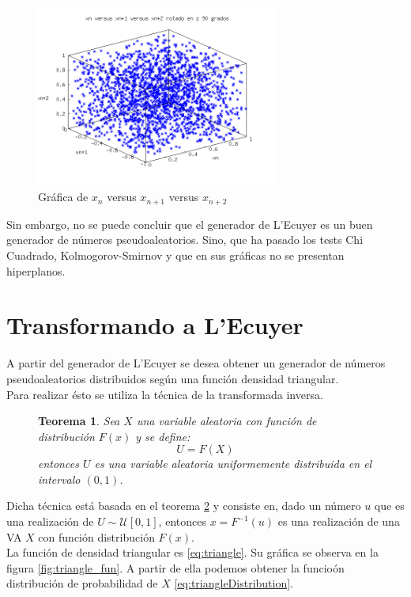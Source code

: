 \documentclass{sig-alternate}
\newtheorem{theorem}{Teorema}
\begin{document}
\begin{figure}[ht]
\label{fig:ecuyer_3D_3}
\includegraphics[width=8cm]{ecuyer3D_3}
\caption{Gr\'afica de $x_{n}$ versus $x_{n+1}$ versus $x_{n+2}$}
\end{figure}

Sin embargo, no se puede concluir que el generador de L'Ecuyer es un buen generador de n\'umeros
pseudoaleatorios. Sino, que ha pasado los tests Chi Cuadrado, Kolmogorov-Smirnov y que en sus
gr\'aficas no se presentan hiperplanos.

\section{Transformando a L'Ecuyer}
\label{sec:triangle}

A partir del generador de L'Ecuyer se desea obtener un generador de n\'umeros
pseudoaleatorios distribuidos seg\'un una funci\'on densidad triangular.\\
Para realizar \'esto se utiliza la t\'ecnica de la transformada inversa.

\begin{figure}[ht]
\begin{theorem}
\label{theo:1}
Sea $X$ una variable aleatoria con funci\'on de distribuci\'on $F(x)$
y se define:
$$U=F(X)$$
entonces $U$ es una variable aleatoria uniformemente distribuida en el intervalo $(0,1)$.
\end{theorem}
\end{figure}

Dicha t\'ecnica est\'a basada en el teorema \ref{theo:1} y consiste
en, dado un n\'umero $u$ que es una realizaci\'on de $U\sim\mathcal{U}[0,1]$,
entonces $x = F^{-1}(u)$ es una realizaci\'on de una VA $X$ con funci\'on
distribuci\'on $F(x)$.\\

La funci\'on de densidad triangular es \eqref{eq:triangle}. Su gr\'afica se observa
en la figura \ref{fig:triangle_fun}. A partir de ella podemos obtener
la funcio\'on distribuci\'on de probabilidad de $X$
\eqref{eq:triangleDistribution}.
\end{document}
